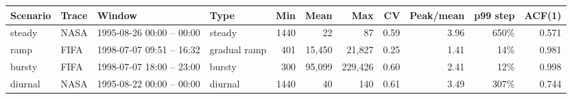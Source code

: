\begin{tabular}{llllrrrrrrr}
\toprule
Scenario & Trace & Window & Type & Min & Mean & Max & CV & Peak/mean & p99 step & ACF(1) \\
\midrule
steady & NASA & 1995-08-26 00:00 -- 00:00 & steady & 1440 & 22 & 87 & 0.59 & 3.96 & 650\% & 0.571 \\
ramp & FIFA & 1998-07-07 09:51 -- 16:32 & gradual ramp & 401 & 15,450 & 21,827 & 0.25 & 1.41 & 14\% & 0.981 \\
bursty & FIFA & 1998-07-07 18:00 -- 23:00 & bursty & 300 & 95,099 & 229,426 & 0.60 & 2.41 & 12\% & 0.998 \\
diurnal & NASA & 1995-08-22 00:00 -- 00:00 & diurnal & 1440 & 40 & 140 & 0.61 & 3.49 & 307\% & 0.744 \\
\bottomrule
\end{tabular}

